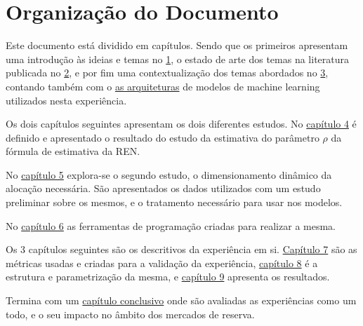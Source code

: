 \section{Organização do Documento \label{se:organização}}

Este documento está dividido em capítulos. Sendo que os primeiros apresentam uma introdução às ideias e temas no \hyperref[ch:intro]{1}, o estado de arte dos temas na literatura publicada no \hyperref[ch:revisao]{2}, e por fim uma contextualização dos temas abordados no \hyperref[ch:contexto]{3}, contando também com o \hyperref[se:arquiteturas_modelos]{as arquiteturas} de modelos de machine learning utilizados nesta experiência.\par
Os dois capítulos seguintes apresentam os dois diferentes estudos. No \hyperref[ch:estudo_1]{capítulo 4} é definido e apresentado o resultado do estudo da estimativa do parâmetro $\rho$ da fórmula de estimativa da \gls{REN}.\par
No \hyperref[ch:estudo_2]{capítulo 5} explora-se o segundo estudo, o dimensionamento dinâmico da alocação necessária. São apresentados os dados utilizados com um estudo preliminar sobre os mesmos, e o tratamento necessário para usar nos modelos.\par
No \hyperref[ch:ferramentas]{capítulo 6} as ferramentas de programação criadas para realizar a mesma.\par
Os 3 capítulos seguintes são os descritivos da experiência em si. \hyperref[ch:metricas]{Capítulo 7} são as métricas usadas e criadas para a validação da experiência, \hyperref[ch:metodos]{capítulo 8} é a estrutura e parametrização da mesma, e \hyperref[ch:resultados_discussao]{capítulo 9} apresenta os resultados.\par
Termina com um \hyperref[ch:conclusao]{capítulo conclusivo} onde são avaliadas as experiências como um todo, e o seu impacto no âmbito dos mercados de reserva.\par